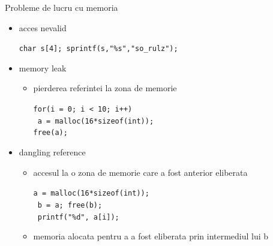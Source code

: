 \documentclass{so.cs.pub.ro}
\begin{document}
\begin{frame}{Probleme de lucru cu memoria}
	\begin{itemize}
		\item acces nevalid
			\begin{beamerboxesrounded}[lower=block body,shadow=true]{}
      		\small{\texttt{char s[4]; sprintf(s,"\%s","so_rulz");}}
			\end{beamerboxesrounded}
		\item memory leak
		\begin{itemize}
		\item pierderea referintei la zona de memorie 
			\begin{beamerboxesrounded}[lower=block body,shadow=true]{}
      		\small{\texttt{for(i = 0; i < 10; i++)\\}}
      		\small{\texttt{\hspace*{0.5in} a = malloc(16*sizeof(int));\\}}
      		\small{\texttt{free(a);}}
			\end{beamerboxesrounded}		
		\end{itemize}
		\item dangling reference
		\begin{itemize}
		\item accesul la o zona de memorie care a fost anterior eliberata 
			\begin{beamerboxesrounded}[lower=block body,shadow=true]{}
      		\small{\texttt{a = malloc(16*sizeof(int));\\}}
      		\small{\texttt{ b = a; free(b);\\}}
      		\small{\texttt{ printf("\%d", a[i]);}}
			\end{beamerboxesrounded}
		\item memoria alocata pentru a a fost eliberata prin intermediul lui b
		\end{itemize}
	\end{itemize}
\end{frame}
\end{document}
